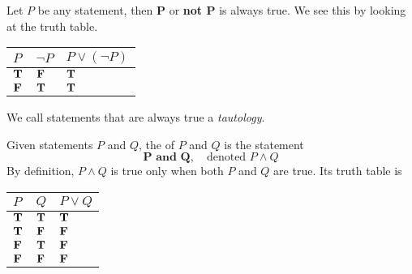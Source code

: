 \begin{example}\label{example:pornot}
Let $P$ be any statement, then $\mathbold{P}$ or \textbf{not $\mathbold{P}$} is always true. We see this by looking at the truth table.
\begin{center}
{\renewcommand{\arraystretch}{1.5}%
\begin{tabular}{|>{\centering}m{1cm}|>{\centering}m{1cm}|>{\centering\arraybackslash}m{2cm}|}
\hline
\rowcolor{lightgrey}
$P$ & $\neg P$ & $P\vee (\neg P)$\\
\hline
$\mathbf{T}$ & $\mathbf{F}$ & $\mathbf{T}$\\
\hline
$\mathbf{F}$ & $\mathbf{T}$ & $\mathbf{T}$\\
\hline
\end{tabular}
}
\end{center}
We call statements that are always true a \emph{tautology}.
\end{example}

\vspace*{1em}

\begin{definition}[Conjunction]
Given statements $P$ and $Q$, the  of $P$ and $Q$ is the statement \[\textbf{$\mathbold{P}$ and $\mathbold{Q}$},\quad \text{denoted $P \wedge Q$}\] By definition, $P \wedge Q$ is true only when both $P$ and $Q$ are true. Its truth table is
\begin{center}
{\renewcommand{\arraystretch}{1.5}%
\begin{tabular}{|>{\centering}m{1cm}|>{\centering}m{1cm}|>{\centering\arraybackslash}m{1cm}|}
\hline
\rowcolor{lightgrey}
$P$ & $Q$ & $P\vee Q$\\
\hline
$\mathbf{T}$ & $\mathbf{T}$ & $\mathbf{T}$\\
\hline
$\mathbf{T}$ & $\mathbf{F}$ & $\mathbf{F}$\\
\hline
$\mathbf{F}$ & $\mathbf{T}$ & $\mathbf{F}$\\
\hline
$\mathbf{F}$ & $\mathbf{F}$ & $\mathbf{F}$\\
\hline
\end{tabular}
}
\end{center}
\end{definition}

\vspace*{1em}

